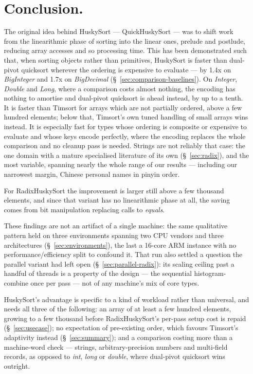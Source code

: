 \documentclass[twoside,leqno,twocolumn]{article}
\begin{document}
\section{Conclusion.}
\label{sec:conclusion}

The original idea behind HuskySort — QuickHuskySort — was to shift work from the linearithmic phase of
sorting into the linear ones, prelude and postlude, reducing array accesses and so processing time.
\label{sec:conclusion-dp}%
This has been demonstrated such that, when sorting objects rather than primitives,
HuskySort is faster than dual-pivot quicksort wherever the ordering is expensive to evaluate ---
by 1.4x on \textit{BigInteger} and 1.7x on \textit{BigDecimal} (\S~\ref{sec:comparison-baselines}).
On \textit{Integer}, \textit{Double} and \textit{Long}, where a comparison costs almost nothing,
the encoding has nothing to amortise and dual-pivot quicksort is ahead instead, by up to a tenth.
It is faster than Timsort for arrays which are not partially ordered, above a few hundred elements;
below that, Timsort's own tuned handling of small arrays wins instead.
It is especially fast for types whose ordering is composite or expensive to evaluate
and whose keys encode perfectly, where the encoding replaces the whole comparison and no cleanup pass is needed.
Strings are not reliably that case: the one domain with a mature specialised literature of its own
(\S~\ref{sec:radix}), and the most variable, spanning nearly the whole range of our results ---
including our narrowest margin, Chinese personal names in pinyin order.

For RadixHuskySort the improvement is larger still above a few thousand elements, and since that
variant has no linearithmic phase at all, the saving comes from bit manipulation replacing calls to
\textit{equals}.

These findings are not an artifact of a single machine: the same qualitative pattern held on three
environments spanning two CPU vendors and three architectures (\S~\ref{sec:environments}), the last a
16-core ARM instance with no performance/efficiency split to confound it.
That run also settled a question the parallel variant had left open (\S~\ref{sec:parallel-radix}): its
scaling ceiling past a handful of threads is a property of the design --- the sequential
histogram-combine once per pass --- not of any machine's mix of core types.

HuskySort's advantage is specific to a kind of workload rather than universal, and needs all three of
the following: an array of at least a few hundred elements, growing to a few thousand before
RadixHuskySort's per-pass setup cost is repaid (\S~\ref{sec:usecase});
no expectation of pre-existing order, which favours Timsort's adaptivity instead (\S~\ref{sec:summary});
and a comparison costing more than a machine-word check --- strings, arbitrary-precision numbers
and multi-field records, as opposed to \textit{int}, \textit{long} or \textit{double},
where dual-pivot quicksort wins outright.
\end{document}
